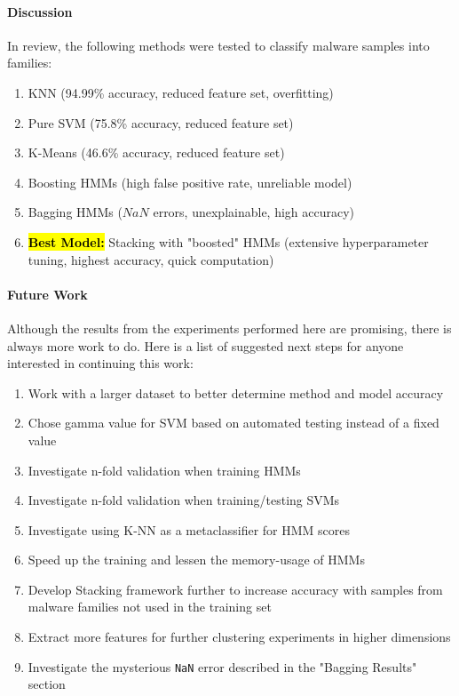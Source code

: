 \documentclass[12pt]{article}
\begin{document}
  \paragraph{Discussion}
    In review, the following methods were tested to classify malware samples into families:
    \begin{enumerate}
      \item KNN (94.99\% accuracy, reduced feature set, overfitting)
      \item Pure SVM (75.8\% accuracy, reduced feature set)
      \item K-Means (46.6\% accuracy, reduced feature set)
      \item Boosting HMMs (high false positive rate, unreliable model)
      \item Bagging HMMs ($NaN$ errors, unexplainable, high accuracy)
      \item \hl{\textbf{Best Model:}} Stacking with "boosted" HMMs (extensive hyperparameter tuning, highest accuracy, quick computation)
    \end{enumerate}
  \paragraph{Future Work}
  Although the results from the experiments performed here are promising, there is always more work to do. Here is a list of suggested next steps for anyone interested in continuing this work: 
  \begin{enumerate}
    \item Work with a larger dataset to better determine method and model accuracy
    \item Chose gamma value for SVM based on automated testing instead of a fixed value
    \item Investigate n-fold validation when training HMMs
    \item Investigate n-fold validation when training/testing SVMs
    \item Investigate using K-NN as a metaclassifier for HMM scores
    \item Speed up the training and lessen the memory-usage of HMMs
    \item Develop Stacking framework further to increase accuracy with samples from malware families not used in the training set
    \item Extract more features for further clustering experiments in higher dimensions
    \item Investigate the mysterious \texttt{NaN} error described in the "Bagging Results" section
  \end{enumerate}
\end{document}
